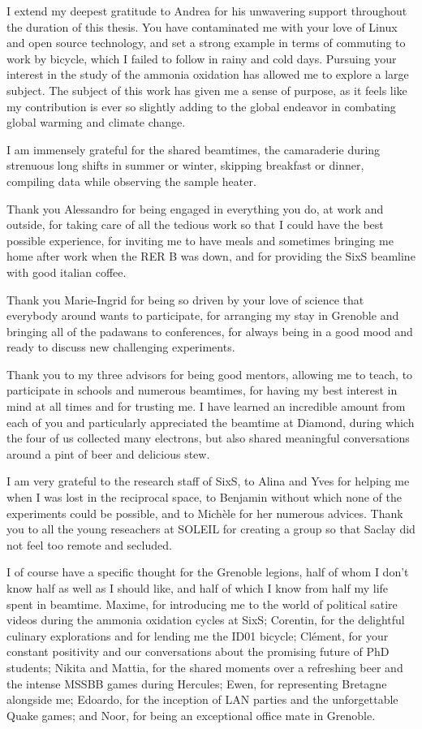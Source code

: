 I extend my deepest gratitude to Andrea for his unwavering support throughout the duration of this thesis.
You have contaminated me with your love of Linux and open source technology, and set a strong example in terms of commuting to work by bicycle, which I failed to follow in rainy and cold days.
Pursuing your interest in the study of the ammonia oxidation has allowed me to explore a large subject.
The subject of this work has given me a sense of purpose, as it feels like my contribution is ever so slightly adding to the global endeavor in combating global warming and climate change.

I am immensely grateful for the shared beamtimes, the camaraderie during strenuous long shifts in summer or winter, skipping breakfast or dinner, compiling data while observing the sample heater.

Thank you Alessandro for being engaged in everything you do, at work and outside, for taking care of all the tedious work so that I could have the best possible experience, for inviting me to have meals and sometimes bringing me home after work when the RER B was down, and for providing the SixS beamline with good italian coffee.

Thank you Marie-Ingrid for being so driven by your love of science that everybody around wants to participate, for arranging my stay in Grenoble and bringing all of the padawans to conferences, for always being in a good mood and ready to discuss new challenging experiments.

Thank you to my three advisors for being good mentors, allowing me to teach, to participate in schools and numerous beamtimes, for having my best interest in mind at all times and for trusting me.
I have learned an incredible amount from each of you and particularly appreciated the beamtime at Diamond, during which the four of us collected many electrons, but also shared meaningful conversations around a pint of beer and delicious stew.

I am very grateful to the research staff of SixS, to Alina and Yves for helping me when I was lost in the reciprocal space, to Benjamin without which none of the experiments could be possible, and to Michèle for her numerous advices.
Thank you to all the young reseachers at SOLEIL for creating a group so that Saclay did not feel too remote and secluded.

I of course have a specific thought for the Grenoble legions, half of whom I don't know half as well as I should like, and half of which I know from half my life spent in beamtime.
Maxime, for introducing me to the world of political satire videos during the ammonia oxidation cycles at SixS; Corentin, for the delightful culinary explorations and for lending me the ID01 bicycle; Clément, for your constant positivity and our conversations about the promising future of PhD students; Nikita and Mattia, for the shared moments over a refreshing beer and the intense MSSBB games during Hercules; Ewen, for representing Bretagne alongside me; Edoardo, for the inception of LAN parties and the unforgettable Quake games; and Noor, for being an exceptional office mate in Grenoble.

